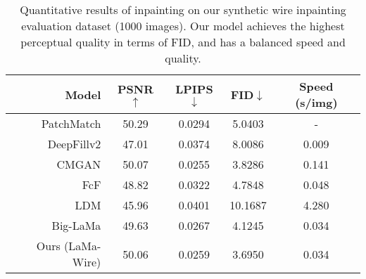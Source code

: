 
\begin{table}[t]\setlength{\tabcolsep}{5pt}
\setlength{\abovecaptionskip}{8pt}
\centering
\footnotesize

\begin{tabular}{r|c c c|c}
\hline
Model &PSNR$\uparrow$&LPIPS$\downarrow$&FID$\downarrow$ &Speed (s/img)\\ \hline
PatchMatch \cite{barnes2009patchmatch}&50.29 &0.0294 & 5.0403 & -\\
DeepFillv2 \cite{yu2019free} &47.01 &0.0374&8.0086 &0.009\\
CMGAN \cite{zheng2022cm} &50.07 &0.0255 &3.8286 &0.141\\
FcF \cite{jain2022keys}&48.82&0.0322&4.7848&0.048\\
LDM \cite{rombach2022high} & 45.96 & 0.0401& 10.1687 & 4.280\\
Big-LaMa \cite{suvorov2022resolution} & 49.63 & 0.0267& 4.1245 &0.034\\
Ours (LaMa-Wire) & 50.06 & 0.0259 & 3.6950 &0.034\\
\hline
\end{tabular}
\vspace{-1mm}
\caption{Quantitative results of inpainting on our synthetic wire inpainting evaluation dataset (1000 images). Our model achieves the highest perceptual quality in terms of FID, and has a balanced speed and quality.}
\label{exp:wire_inp}
\end{table}